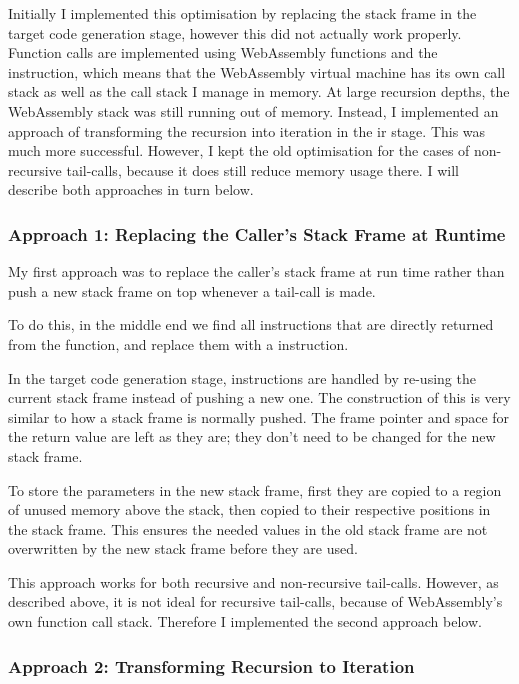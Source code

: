 \documentclass[00-main.tex]{subfiles}
\begin{document}
Initially I implemented this optimisation by replacing the stack frame in the target code generation stage, however this did not actually work properly.
Function calls are implemented using WebAssembly functions and the  instruction, which means that the WebAssembly virtual machine has its own call stack as well as the call stack I manage in memory.
At large recursion depths, the WebAssembly stack was still running out of memory.
Instead, I implemented an approach of transforming the recursion into iteration in the \gls{ir} stage.
This was much more successful.
However, I kept the old optimisation for the cases of non-recursive tail-calls, because it does still reduce memory usage there.
I will describe both approaches in turn below.

\subsubsection{Approach 1: Replacing the Caller's Stack Frame at Runtime}

My first approach was to replace the caller's stack frame at run time rather than push a new stack frame on top whenever a tail-call is made.

To do this, in the middle end we find all  instructions that are directly returned from the function, and replace them with a  instruction.

In the target code generation stage,  instructions are handled by re-using the current stack frame instead of pushing a new one.
The construction of this is very similar to how a stack frame is normally pushed.
The frame pointer and space for the return value are left as they are; they don't need to be changed for the new stack frame.

To store the parameters in the new stack frame, first they are copied to a region of unused memory above the stack, then copied to their respective positions in the stack frame. This ensures the needed values in the old stack frame are not overwritten by the new stack frame before they are used.

This approach works for both recursive and non-recursive tail-calls.
However, as described above, it is not ideal for recursive tail-calls, because of WebAssembly's own function call stack.
Therefore I implemented the second approach below.

\subsubsection{Approach 2: Transforming Recursion to Iteration}
\end{document}
